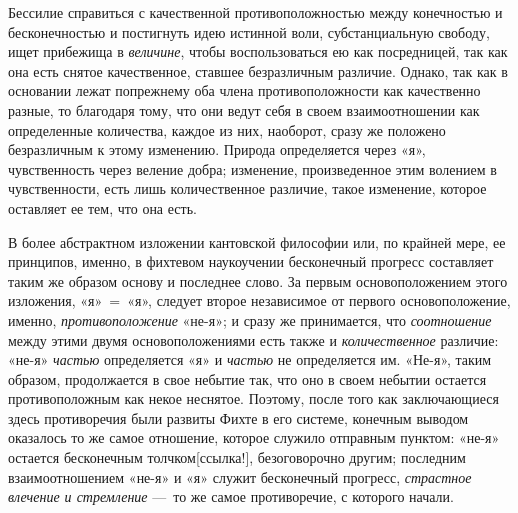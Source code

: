 {Бессилие справиться с качественной противоположностью между конечностью и
бесконечностью и постигнуть идею истинной воли, субстанциальную свободу,
ищет прибежища в {\em величине}, чтобы воспользоваться
ею как посредницей, так как она есть снятое качественное, ставшее
безразличным различие. Однако, так как в основании лежат попрежнему оба
члена противоположности как качественно разные, то благодаря тому, что они
ведут себя в своем взаимоотношении как определенные количества, каждое из
них, наоборот, сразу же положено безразличным к этому изменению. Природа
определяется через «я», чувственность через веление добра; изменение,
произведенное этим волением в чувственности, есть лишь количественное
различие, такое изменение, которое оставляет ее тем, что она есть.

В более абстрактном изложении кантовской философии или, по крайней мере, ее
принципов, именно, в фихтевом наукоучении бесконечный прогресс составляет
таким же образом основу и последнее слово. За первым основоположением этого
изложения, «я»~=~«я», следует второе независимое от первого
основоположение, именно, {\em противоположение} «не-я»;
и сразу же принимается, что {\em соотношение} между
этими двумя основоположениями есть также и
{\em количественное} различие: «не-я»
{\em частью} определяется «я» и
{\em частью} не определяется им. «Не-я», таким образом,
продолжается в свое небытие так, что оно в своем небытии остается
противоположным как некое неснятое. Поэтому, после того как заключающиеся
здесь противоречия были развиты Фихте в его системе, конечным выводом
оказалось то же самое отношение, которое служило отправным пунктом: «не-я»
остается бесконечным
толчком[ссылка!], безоговорочно другим; последним
взаимоотношением «не-я» и «я» служит бесконечный прогресс,
{\em страстное влечение и стремление} —~то же самое
противоречие, с которого начали.

}
